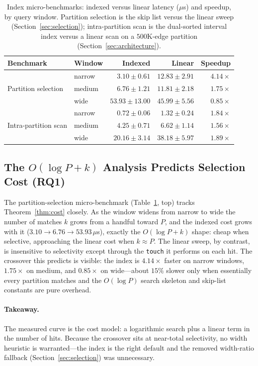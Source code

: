 \documentclass[10pt]{article}
\theoremstyle{definition}
\begin{document}
\begin{table}[t]
\centering
\caption{Index micro-benchmarks: indexed versus linear latency ($\mu$s) and speedup,
by query window. Partition selection is the skip list versus the linear sweep
(Section~\ref{sec:selection}); intra-partition scan is the dual-sorted interval
index versus a linear scan on a $500$K-edge partition
(Section~\ref{sec:architecture}).}
\label{tab:micro}
\begin{tabular}{llrrr}
\toprule
Benchmark & Window & Indexed & Linear & Speedup \\
\midrule
\multirow{3}{*}{Partition selection}
 & narrow & $3.10\pm0.61$  & $12.83\pm2.91$ & $\mathbf{4.14\times}$ \\
 & medium & $6.76\pm1.21$  & $11.81\pm2.18$ & $1.75\times$ \\
 & wide   & $53.93\pm13.00$& $45.99\pm5.56$ & $0.85\times$ \\
\midrule
\multirow{3}{*}{Intra-partition scan}
 & narrow & $0.72\pm0.06$  & $1.32\pm0.24$  & $1.84\times$ \\
 & medium & $4.25\pm0.71$  & $6.62\pm1.14$  & $1.56\times$ \\
 & wide   & $20.16\pm3.14$ & $38.18\pm5.97$ & $1.89\times$ \\
\bottomrule
\end{tabular}
\end{table}

\subsection{The $O(\log P + k)$ Analysis Predicts Selection Cost (RQ1)}
\label{sec:rq1}

The partition-selection micro-benchmark (Table~\ref{tab:micro}, top) tracks
Theorem~\ref{thm:cost} closely. As the window widens from narrow to wide the number
of matches $k$ grows from a handful toward $P$, and the indexed cost grows with it
($3.10\!\rightarrow\!6.76\!\rightarrow\!53.93\,\mu$s), exactly the $O(\log P + k)$
shape: cheap when selective, approaching the linear cost when $k\approx P$. The
linear sweep, by contrast, is insensitive to selectivity except through the
\texttt{touch} it performs on each hit. The crossover this predicts is visible: the
index is $4.14\times$ faster on narrow windows, $1.75\times$ on medium, and
$0.85\times$ on wide---about $15\%$ slower only when essentially every partition
matches and the $O(\log P)$ search skeleton and skip-list constants are pure
overhead.

\paragraph{Takeaway.}
The measured curve is the cost model: a logarithmic search plus a linear term in the
number of hits. Because the crossover sits at near-total selectivity, no width
heuristic is warranted---the index is the right default and the removed width-ratio
fallback (Section~\ref{sec:selection}) was unnecessary.
\end{document}
